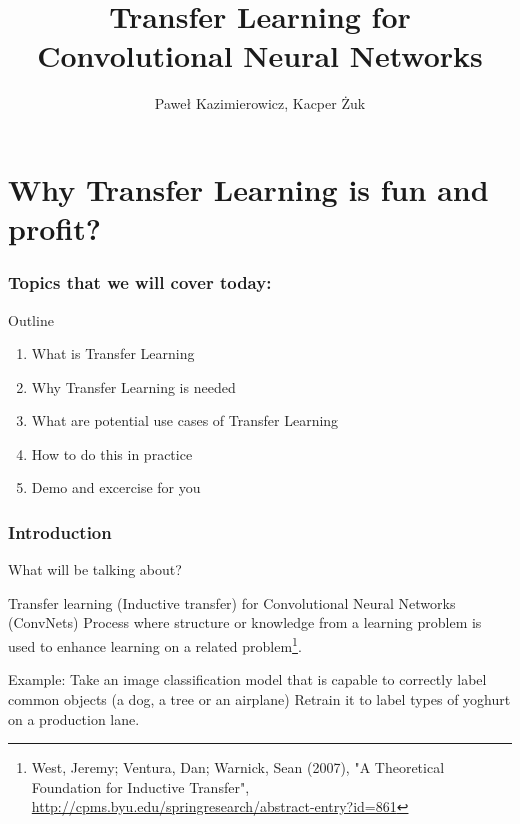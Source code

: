\documentclass[aspectratio=1610,english]{beamer} %
\title{Transfer Learning for Convolutional Neural Networks}
\author{Paweł Kazimierowicz, Kacper Żuk}
\date{}
\institute[AGH]{

}
\begin{document}
  	\maketitle
	\part{Why Transfer Learning is fun and profit?}
	\section{Topics that we will cover today:}
	\begin{frame}{Outline}
		\begin{enumerate}
			\item What is Transfer Learning 
			\item Why Transfer Learning is needed
			\item What are potential use cases of Transfer Learning 
			\item How to do this in practice
			\item Demo and excercise for you
		\end{enumerate}
	\end{frame}
	\section{Introduction}
		\begin{frame}{What will be talking about?}
			\begin{block}{Transfer learning (Inductive transfer) for Convolutional Neural Networks (ConvNets)}
				Process where structure or knowledge from a learning problem is used to enhance learning on a related problem\footnote{West, Jeremy; Ventura, Dan; Warnick, Sean (2007), "A Theoretical Foundation for Inductive Transfer", \url{http://cpms.byu.edu/springresearch/abstract-entry?id=861}}. 
			\end{block}
			Example: \newline
			Take an image classification model that is capable to correctly label common objects (a dog, a tree or an airplane)
			Retrain it to label types of yoghurt on a production lane.
		\end{frame}
	
\end{document}
